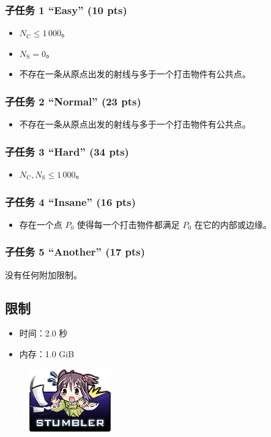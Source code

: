 \documentclass[UTF8, 11pt, a4paper]{article}
\begin{document}
\subsubsection*{子任务 1 “Easy” (10 pts)}
\begin{itemize}
    \item $N_\mathrm{C} \leq 1\,000$。
    \item $N_\mathrm{S} = 0$。
    \item 不存在一条从原点出发的射线与多于一个打击物件有公共点。
\end{itemize}
\subsubsection*{子任务 2 “Normal” (23 pts)}
\begin{itemize}
    \item 不存在一条从原点出发的射线与多于一个打击物件有公共点。
\end{itemize}
\subsubsection*{子任务 3 “Hard” (34 pts)}
\begin{itemize}
    \item $N_\mathrm{C}, N_\mathrm{S} \leq 1\,000$。
\end{itemize}
\subsubsection*{子任务 4 “Insane” (16 pts)}
\begin{itemize}
    \item 存在一个点 $P_0$ 使得每一个打击物件都满足 $P_0$ 在它的内部或边缘。
\end{itemize}
\subsubsection*{子任务 5 “Another” (17 pts)}
    没有任何附加限制。

\subsection*{限制}
\begin{itemize}
\item 时间：2.0 秒
\item 内存：1.0 GiB
\end{itemize}

\begin{figure}[h]\centering
\includegraphics[scale=0.55]{stumbler.png}
\end{figure}
\end{document}
